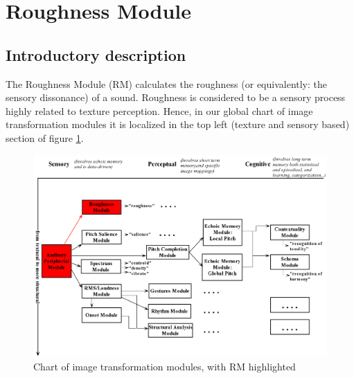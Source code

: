 \newpage
\section{Roughness Module}

\hypertarget{Concepts:RoughnessModule}{}

\hypertarget{Concepts:IPEMRoughnessFFT}{}

\subsection{Introductory description}

The Roughness Module (RM) calculates the roughness (or
equivalently: the sensory dissonance) of a sound. Roughness is
considered to be a sensory process highly related to texture
perception. Hence, in our global chart of image transformation
modules it is localized in the top left (texture and sensory
based) section of figure \ref{Fig:ModulesRM}.
\begin{figure}[h]
    \centering
    \includegraphics[width=\textwidth]{Graphics/ModulesRM}
    \caption{Chart of image transformation modules, with RM highlighted}
    \label{Fig:ModulesRM}
\end{figure}

